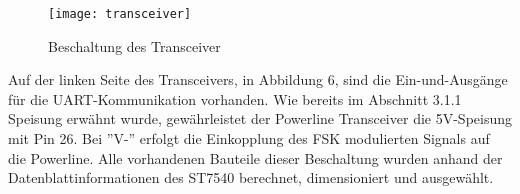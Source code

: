 \clearpage

\begin{figure}[h]
\centering
\texttt{[image: transceiver]}
\caption{Beschaltung des Transceiver}
\end{figure}

Auf der linken Seite des Transceivers, in Abbildung 6, sind die Ein-und-Ausgänge für die UART-Kommunikation vorhanden. Wie bereits im Abschnitt 3.1.1 Speisung erwähnt wurde, gewährleistet der Powerline Transceiver die 5V-Speisung mit Pin 26.
Bei ''V-'' erfolgt die Einkopplung des FSK modulierten Signals auf die Powerline. Alle vorhandenen Bauteile dieser Beschaltung wurden anhand der Datenblattinformationen des ST7540 berechnet, dimensioniert und ausgewählt.

